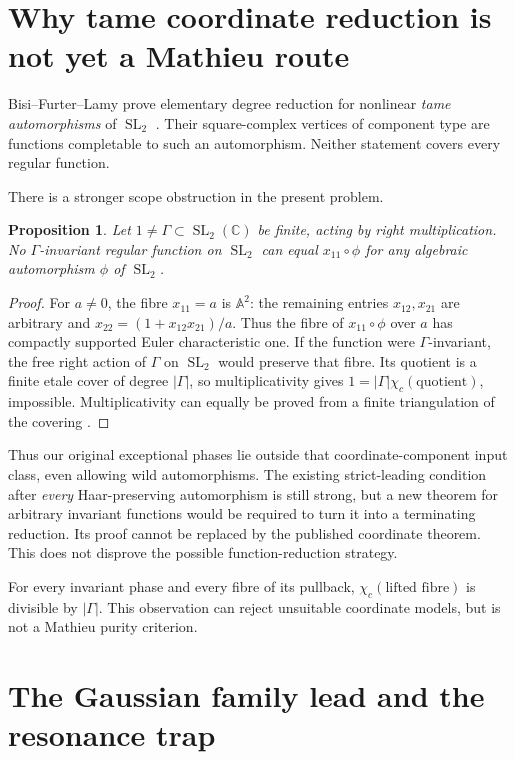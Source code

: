 \documentclass[11pt]{article}
\newtheorem{proposition}{Proposition}
\newcommand{\C}{\mathbb C}
\newcommand{\A}{\mathbb A}
\newcommand{\SL}{\operatorname{SL}}
\begin{document}
\section{Why tame coordinate reduction is not yet a Mathieu route}

Bisi--Furter--Lamy prove elementary degree reduction for nonlinear
\emph{tame automorphisms} of $\SL_2$ \cite{bfl}. Their square-complex
vertices of component type are functions completable to such an
automorphism. Neither statement covers every regular function.

There is a stronger scope obstruction in the present problem.
\begin{proposition}
Let $1\ne\Gamma\subset\SL_2(\C)$ be finite, acting by right multiplication.
No $\Gamma$-invariant regular function on $\SL_2$ can equal
$x_{11}\circ\phi$ for any algebraic automorphism $\phi$ of $\SL_2$.
\end{proposition}
\begin{proof}
For $a\ne0$, the fibre $x_{11}=a$ is $\A^2$: the remaining entries
$x_{12},x_{21}$ are arbitrary and
$x_{22}=(1+x_{12}x_{21})/a$. Thus the fibre of $x_{11}\circ\phi$ over $a$
has compactly supported Euler characteristic one. If the function were
$\Gamma$-invariant, the free right action of $\Gamma$ on $\SL_2$ would
preserve that fibre. Its quotient is a finite etale cover of degree
$|\Gamma|$, so multiplicativity gives
$1=|\Gamma|\chi_c(\text{quotient})$, impossible. Multiplicativity can
equally be proved from a finite triangulation of the covering
\cite{euler}.
\end{proof}

Thus our original exceptional phases lie outside that coordinate-component
input class, even allowing wild automorphisms. The existing strict-leading
condition after \emph{every} Haar-preserving automorphism is still strong,
but a new theorem for arbitrary invariant functions would be required to
turn it into a terminating reduction. Its proof cannot be replaced by the
published coordinate theorem. This does not disprove the possible
function-reduction strategy.

For every invariant phase and every fibre of its pullback,
$\chi_c(\text{lifted fibre})$ is divisible by $|\Gamma|$. This observation
can reject unsuitable coordinate models, but is not a Mathieu purity
criterion.

\section{The Gaussian family lead and the resonance trap}
\end{document}

